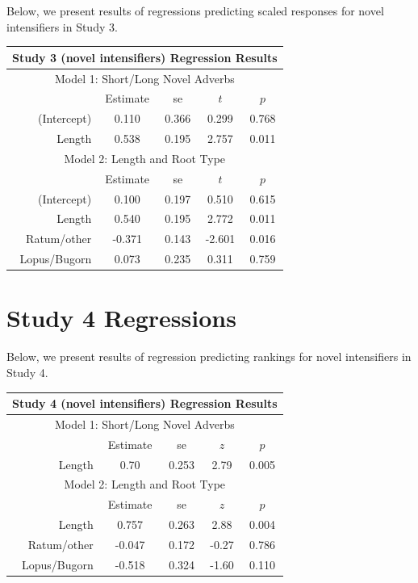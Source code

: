 \begin{appendices}
\vspace{4mm}

Below, we present results of regressions predicting scaled responses for novel intensifiers in Study 3.

\vspace{4mm}

\noindent
\footnotesize{
\begin{tabular}{r|cccc}
\hline
\hline
\multicolumn{5}{c}{\textbf{Study 3 (novel intensifiers) Regression Results}} \\
\hline
\hline
\multicolumn{5}{c}{Model 1: Short/Long Novel Adverbs} \\
& Estimate & se & $t$ & $p$ \\
\hline
(Intercept) &  0.110 & 0.366 & 0.299 & 0.768 \\
Length &  0.538 & 0.195 & 2.757 & 0.011 \\
\hline
\hline
\multicolumn{5}{c}{Model 2: Length and Root Type} \\
& Estimate & se & $t$ & $p$ \\
\hline
(Intercept) & 0.100  & 0.197 & 0.510 & 0.615 \\
Length & 0.540  & 0.195 &   2.772 & 0.011 \\
Ratum/other & -0.371  & 0.143 &  -2.601 & 0.016 \\
Lopus/Bugorn &  0.073  & 0.235 &   0.311 & 0.759 \\
\hline
\hline
\end{tabular}
}

\section{Study 4 Regressions}

Below, we present results of regression predicting rankings for novel intensifiers in Study 4.

\vspace{4mm}

\noindent
\footnotesize{
\begin{tabular}{r|cccc}
\hline
\hline
\multicolumn{5}{c}{\textbf{Study 4 (novel intensifiers) Regression Results}} \\
\hline
\hline
\multicolumn{5}{c}{Model 1: Short/Long Novel Adverbs} \\
& Estimate & se & $z$ & $p$ \\
\hline
Length & 0.70 & 0.253 & 2.79 & 0.005 \\
\hline
\hline
\multicolumn{5}{c}{Model 2: Length and Root Type} \\
& Estimate & se & $z$ & $p$ \\
\hline
Length       &  0.757 & 0.263 &  2.88 & 0.004 \\
Ratum/other  & -0.047 & 0.172 & -0.27 & 0.786 \\ 
Lopus/Bugorn & -0.518 & 0.324 & -1.60 & 0.110 \\
\hline
\hline
\end{tabular}
} 


\end{appendices}

